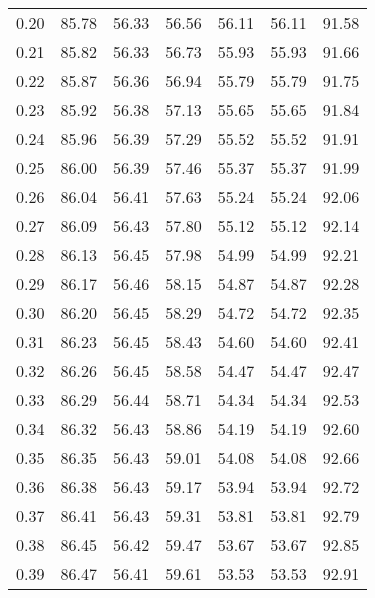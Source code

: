 \begin{tabular}{|c|c|c|c|c|c|c|}
      0.20 &     85.78 &     56.33 &      56.56 &   56.11 &      56.11 &         91.58 \\
      0.21 &     85.82 &     56.33 &      56.73 &   55.93 &      55.93 &         91.66 \\
      0.22 &     85.87 &     56.36 &      56.94 &   55.79 &      55.79 &         91.75 \\
      0.23 &     85.92 &     56.38 &      57.13 &   55.65 &      55.65 &         91.84 \\
      0.24 &     85.96 &     56.39 &      57.29 &   55.52 &      55.52 &         91.91 \\
      0.25 &     86.00 &     56.39 &      57.46 &   55.37 &      55.37 &         91.99 \\
      0.26 &     86.04 &     56.41 &      57.63 &   55.24 &      55.24 &         92.06 \\
      0.27 &     86.09 &     56.43 &      57.80 &   55.12 &      55.12 &         92.14 \\
      0.28 &     86.13 &     56.45 &      57.98 &   54.99 &      54.99 &         92.21 \\
      0.29 &     86.17 &     56.46 &      58.15 &   54.87 &      54.87 &         92.28 \\
      0.30 &     86.20 &     56.45 &      58.29 &   54.72 &      54.72 &         92.35 \\
      0.31 &     86.23 &     56.45 &      58.43 &   54.60 &      54.60 &         92.41 \\
      0.32 &     86.26 &     56.45 &      58.58 &   54.47 &      54.47 &         92.47 \\
      0.33 &     86.29 &     56.44 &      58.71 &   54.34 &      54.34 &         92.53 \\
      0.34 &     86.32 &     56.43 &      58.86 &   54.19 &      54.19 &         92.60 \\
      0.35 &     86.35 &     56.43 &      59.01 &   54.08 &      54.08 &         92.66 \\
      0.36 &     86.38 &     56.43 &      59.17 &   53.94 &      53.94 &         92.72 \\
      0.37 &     86.41 &     56.43 &      59.31 &   53.81 &      53.81 &         92.79 \\
      0.38 &     86.45 &     56.42 &      59.47 &   53.67 &      53.67 &         92.85 \\
      0.39 &     86.47 &     56.41 &      59.61 &   53.53 &      53.53 &         92.91 \\

\end{tabular}
